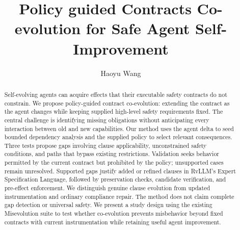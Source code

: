 \documentclass[acmsmall,review,anonymous,screen]{acmart}
\begin{document}
\title{Policy guided Contracts Co-evolution for Safe Agent Self-Improvement }

\author{Haoyu Wang}
\begin{abstract}

Self-evolving agents can acquire effects that their executable safety contracts do not constrain. We propose policy-guided contract co-evolution: extending the contract as the agent changes while keeping supplied high-level safety requirements fixed. The central challenge is identifying missing obligations without anticipating every interaction between old and new capabilities. Our method uses the agent delta to seed bounded dependency analysis and the supplied policy to select relevant consequences. Three tests propose gaps involving clause applicability, unconstrained safety conditions, and paths that bypass existing restrictions. Validation seeks behavior permitted by the current contract but prohibited by the policy; unsupported cases remain unresolved. Supported gaps justify added or refined clauses in RvLLM's Expert Specification Language, followed by preservation checks, candidate verification, and pre-effect enforcement. We distinguish genuine clause evolution from updated instrumentation and ordinary compliance repair. The method does not claim complete gap detection or universal safety. We present a study design using the existing Misevolution suite to test whether co-evolution prevents misbehavior beyond fixed contracts with current instrumentation while retaining useful agent improvement.
\end{abstract}
\maketitle













\end{document}
